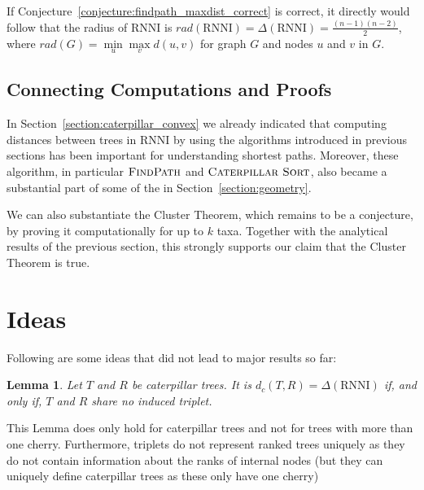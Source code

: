 \documentclass{amsart}
\newcommand{\rnni}{\mathrm{RNNI}}
\newcommand{\csort}{\textsc{Caterpillar Sort}}
\newcommand{\findpath}{\textsc{FindPath}}
\newtheorem{lemma}[definition]{Lemma}
\begin{document}

If Conjecture~\ref{conjecture:findpath_maxdist_correct} is correct, it directly would follow that the radius of $\rnni$ is $rad(\rnni) = \Delta(\rnni) = \frac{(n-1)(n-2)}{2}$, where $rad(G) = \min\limits_u \max\limits_v d(u,v)$ for graph $G$ and nodes $u$ and $v$ in $G$.

\subsection{Connecting Computations and Proofs}

In Section~\ref{section:caterpillar_convex} we already indicated that computing distances between trees in $\rnni$ by using the algorithms introduced in previous sections has been important for understanding shortest paths.
Moreover, these algorithm, in particular $\findpath$ and $\csort$, also became a substantial part of some of the in Section~\ref{section:geometry}.

We can also substantiate the Cluster Theorem, which remains to be a conjecture, by proving it computationally for up to $k$ taxa. 
Together with the analytical results of the previous section, this strongly supports our claim that the Cluster Theorem is true.


\section{Ideas}

Following are some ideas that did not lead to major results so far:

\begin{lemma}
    Let $T$ and $R$ be caterpillar trees.
    It is $d_c(T,R) = \Delta(\rnni)$ if, and only if, $T$ and $R$ share no induced triplet.
\end{lemma}

This Lemma does only hold for caterpillar trees and not for trees with more than one cherry.
Furthermore, triplets do not represent ranked trees uniquely as they do not contain information about the ranks of internal nodes (but they can uniquely define caterpillar trees as these only have one cherry)
\end{document}
